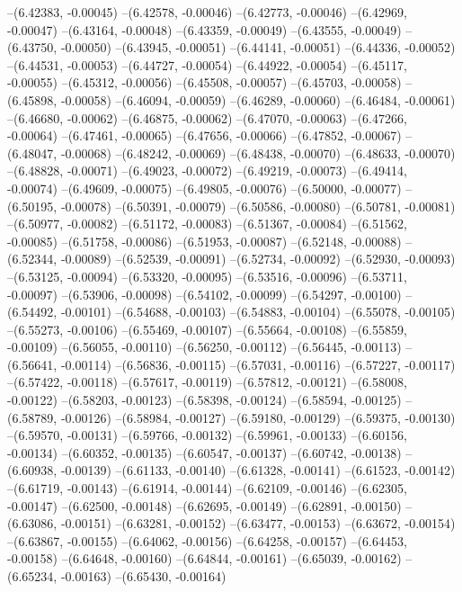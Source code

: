 --(6.42383, -0.00045)
--(6.42578, -0.00046)
--(6.42773, -0.00046)
--(6.42969, -0.00047)
--(6.43164, -0.00048)
--(6.43359, -0.00049)
--(6.43555, -0.00049)
--(6.43750, -0.00050)
--(6.43945, -0.00051)
--(6.44141, -0.00051)
--(6.44336, -0.00052)
--(6.44531, -0.00053)
--(6.44727, -0.00054)
--(6.44922, -0.00054)
--(6.45117, -0.00055)
--(6.45312, -0.00056)
--(6.45508, -0.00057)
--(6.45703, -0.00058)
--(6.45898, -0.00058)
--(6.46094, -0.00059)
--(6.46289, -0.00060)
--(6.46484, -0.00061)
--(6.46680, -0.00062)
--(6.46875, -0.00062)
--(6.47070, -0.00063)
--(6.47266, -0.00064)
--(6.47461, -0.00065)
--(6.47656, -0.00066)
--(6.47852, -0.00067)
--(6.48047, -0.00068)
--(6.48242, -0.00069)
--(6.48438, -0.00070)
--(6.48633, -0.00070)
--(6.48828, -0.00071)
--(6.49023, -0.00072)
--(6.49219, -0.00073)
--(6.49414, -0.00074)
--(6.49609, -0.00075)
--(6.49805, -0.00076)
--(6.50000, -0.00077)
--(6.50195, -0.00078)
--(6.50391, -0.00079)
--(6.50586, -0.00080)
--(6.50781, -0.00081)
--(6.50977, -0.00082)
--(6.51172, -0.00083)
--(6.51367, -0.00084)
--(6.51562, -0.00085)
--(6.51758, -0.00086)
--(6.51953, -0.00087)
--(6.52148, -0.00088)
--(6.52344, -0.00089)
--(6.52539, -0.00091)
--(6.52734, -0.00092)
--(6.52930, -0.00093)
--(6.53125, -0.00094)
--(6.53320, -0.00095)
--(6.53516, -0.00096)
--(6.53711, -0.00097)
--(6.53906, -0.00098)
--(6.54102, -0.00099)
--(6.54297, -0.00100)
--(6.54492, -0.00101)
--(6.54688, -0.00103)
--(6.54883, -0.00104)
--(6.55078, -0.00105)
--(6.55273, -0.00106)
--(6.55469, -0.00107)
--(6.55664, -0.00108)
--(6.55859, -0.00109)
--(6.56055, -0.00110)
--(6.56250, -0.00112)
--(6.56445, -0.00113)
--(6.56641, -0.00114)
--(6.56836, -0.00115)
--(6.57031, -0.00116)
--(6.57227, -0.00117)
--(6.57422, -0.00118)
--(6.57617, -0.00119)
--(6.57812, -0.00121)
--(6.58008, -0.00122)
--(6.58203, -0.00123)
--(6.58398, -0.00124)
--(6.58594, -0.00125)
--(6.58789, -0.00126)
--(6.58984, -0.00127)
--(6.59180, -0.00129)
--(6.59375, -0.00130)
--(6.59570, -0.00131)
--(6.59766, -0.00132)
--(6.59961, -0.00133)
--(6.60156, -0.00134)
--(6.60352, -0.00135)
--(6.60547, -0.00137)
--(6.60742, -0.00138)
--(6.60938, -0.00139)
--(6.61133, -0.00140)
--(6.61328, -0.00141)
--(6.61523, -0.00142)
--(6.61719, -0.00143)
--(6.61914, -0.00144)
--(6.62109, -0.00146)
--(6.62305, -0.00147)
--(6.62500, -0.00148)
--(6.62695, -0.00149)
--(6.62891, -0.00150)
--(6.63086, -0.00151)
--(6.63281, -0.00152)
--(6.63477, -0.00153)
--(6.63672, -0.00154)
--(6.63867, -0.00155)
--(6.64062, -0.00156)
--(6.64258, -0.00157)
--(6.64453, -0.00158)
--(6.64648, -0.00160)
--(6.64844, -0.00161)
--(6.65039, -0.00162)
--(6.65234, -0.00163)
--(6.65430, -0.00164)
